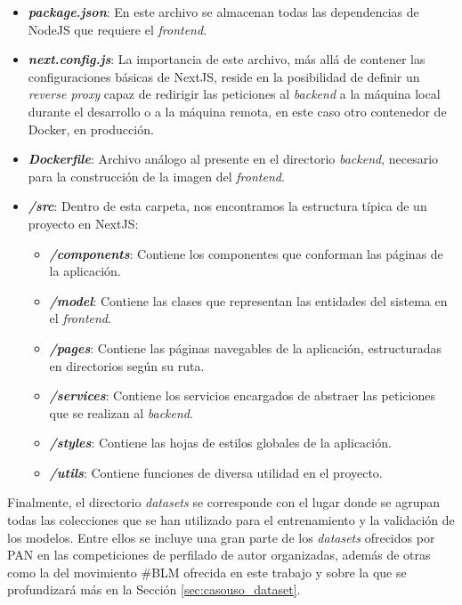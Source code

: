 \begin{itemize}
	\item \textbf{\textit{package.json}}: En este archivo se almacenan todas las dependencias de NodeJS que requiere el \textit{frontend}.
	\item \textbf{\textit{next.config.js}}: La importancia de este archivo, más allá de contener las configuraciones básicas de NextJS, reside en la posibilidad
	      de definir un \textit{reverse proxy} capaz de redirigir las peticiones al \textit{backend} a la máquina local durante el desarrollo o a la máquina remota,
	      en este caso otro contenedor de Docker, en producción.
	\item \textbf{\textit{Dockerfile}}: Archivo análogo al presente en el directorio \textit{backend}, necesario para la construcción de la imagen del \textit{frontend}.
	\item \textbf{\textit{/src}}: Dentro de esta carpeta, nos encontramos la estructura típica de un proyecto en NextJS:
	      \begin{itemize}
		      \item \textbf{\textit{/components}}: Contiene los componentes que conforman las páginas de la aplicación.
		      \item \textbf{\textit{/model}}: Contiene las clases que representan las entidades del sistema en el \textit{frontend}.
		      \item \textbf{\textit{/pages}}: Contiene las páginas navegables de la aplicación, estructuradas en directorios según su ruta.
		      \item \textbf{\textit{/services}}: Contiene los servicios encargados de abstraer las peticiones que se realizan al \textit{backend}.
		      \item \textbf{\textit{/styles}}: Contiene las hojas de estilos globales de la aplicación.
		      \item \textbf{\textit{/utils}}: Contiene funciones de diversa utilidad en el proyecto.
	      \end{itemize}
\end{itemize}

\bigskip
Finalmente, el directorio \textit{datasets} se corresponde con el lugar donde se agrupan todas las colecciones que se han utilizado
para el entrenamiento y la validación de los modelos. Entre ellos se incluye una gran parte de los \textit{datasets} ofrecidos por PAN \cite{pan} en las competiciones
de perfilado de autor organizadas, además de otras como la del movimiento \#BLM ofrecida en este trabajo y sobre la que se profundizará más en la Sección \ref{sec:casouso_dataset}.

